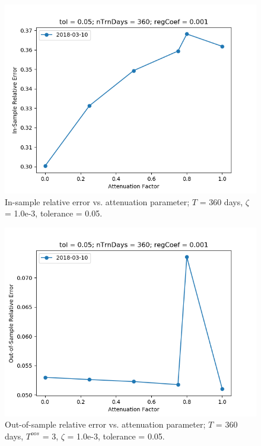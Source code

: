\documentclass{article}
\begin{document}
\begin{figure}
\includegraphics[scale=0.9,bb=0 0 640 480]{figures/atnFct-sensitivity-error.png}
\caption{In-sample relative error vs. attenuation parameter; $T$ = 360
  days, $\zeta$ = 1.0e-3, tolerance = 0.05.}
\label{fig:atnFct-sensitivity-error}
\end{figure}

\begin{figure}
\includegraphics[scale=0.9,bb=0 0 640 480]{figures/atnFct-sensitivity-oos-error.png}
\caption{Out-of-sample relative error vs. attenuation parameter; $T$ =
  360 days, $T^{oos}$ = 3, $\zeta$ = 1.0e-3, tolerance = 0.05.}
\label{fig:atnFct-sensitivity-oos-error}
\end{figure}
\end{document}
